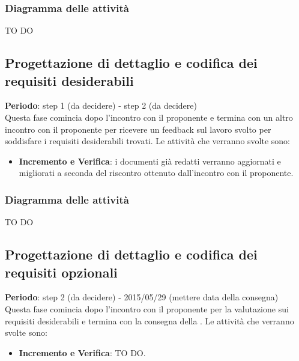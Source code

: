 		\subsubsection{Diagramma delle attività} %
		\label{ssub:diagramma_delle_attivita}
		TO DO
	
	\subsection{Progettazione di dettaglio e codifica dei requisiti desiderabili} %
	\label{sub:progettazione_di_dettaglio_e_codifica_dei_requisiti_desiderabili}
	\textbf{Periodo}:  step 1 (da decidere) - step 2 (da decidere) \\
	Questa fase comincia dopo l'incontro con il proponente e termina con un altro incontro con il proponente per ricevere un feedback sul lavoro svolto per soddisfare i requisiti desiderabili trovati.
	Le attività che verranno svolte sono:
		\begin{itemize}
			\item \textbf{Incremento e Verifica}: i documenti già redatti verranno aggiornati e migliorati a seconda del riscontro ottenuto dall'incontro con il proponente.
		\end{itemize}
		
		\subsubsection{Diagramma delle attività} %
		\label{ssub:diagramma_delle_attivita}
		TO DO
	
	\subsection{Progettazione di dettaglio e codifica dei requisiti opzionali} %
	\label{sub:progettazione_di_dettaglio_e_codifica_dei_requisiti_opzionali}
	\textbf{Periodo}:  step 2 (da decidere) - 2015/05/29 (mettere data della consegna) \\
	Questa fase comincia dopo l'incontro con il proponente per la valutazione sui requisiti desiderabili e termina con la consegna della \RQ.
	Le attività che verranno svolte sono:
		\begin{itemize}
			\item \textbf{Incremento e Verifica}: TO DO.
		\end{itemize}
			
